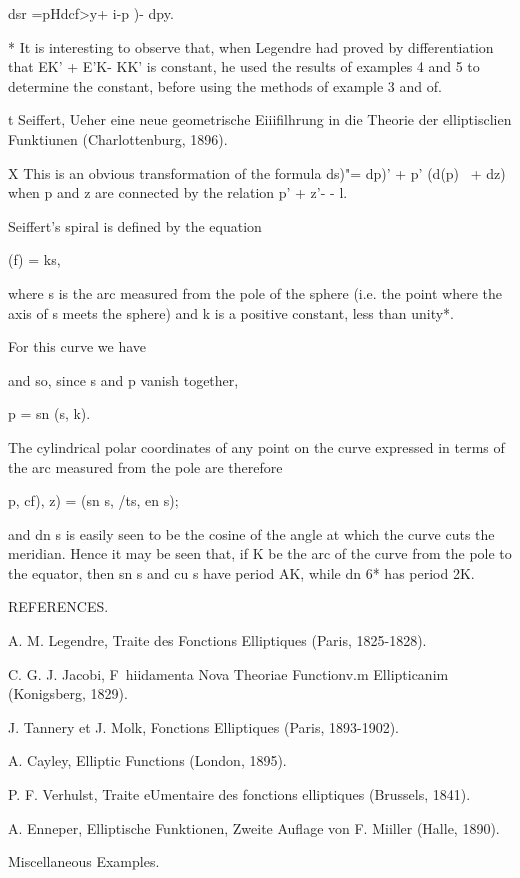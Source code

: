  dsr =pHdcf>y+ i-p )- dpy.

* It is interesting to observe that, when Legendre had proved by
differentiation that EK' + E'K- KK' is constant, he used the results
of examples 4 and 5 to determine the constant, before using the
methods of example 3 and of.

t Seiffert, Ueher eine neue geometrische Eiiifilhrung in die Theorie
der elliptisclien Funktiunen (Charlottenburg, 1896).

X This is an obvious transformation of the formula ds)"= dp)' + p'
(d(p)~ + dz) when p and z are connected by the relation p' + z'- - l.

%
%

Seiffert's spiral is defined by the equation

(f) = ks,

where s is the arc measured from the pole of the sphere (i.e. the
point where the axis of s meets the sphere) and k is a positive
constant, less than unity*.

For this curve we have

and so, since s and p vanish together,

p = sn (s, k).

The cylindrical polar coordinates of any point on the curve expressed
in terms of the arc measured from the pole are therefore

 p, cf), z) = (sn s, /ts, en s);

and dn s is easily seen to be the cosine of the angle at which the
curve cuts the meridian. Hence it may be seen that, if K be the arc of
the curve from the pole to the equator, then sn s and cu s have period
AK, while dn 6* has period 2K.

REFERENCES.

A. M. Legendre, Traite des Fonctions Elliptiques (Paris, 1825-1828).

C. G. J. Jacobi, F\ hiidamenta Nova Theoriae Functionv.m Ellipticanim
(Konigsberg, 1829).

J. Tannery et J. Molk, Fonctions Elliptiques (Paris, 1893-1902).

A. Cayley, Elliptic Functions (London, 1895).

P. F. Verhulst, Traite eUmentaire des fonctions elliptiques (Brussels,
1841).

A. Enneper, Elliptische Funktionen, Zweite Auflage von F. Miiller
(Halle, 1890).

Miscellaneous Examples.

